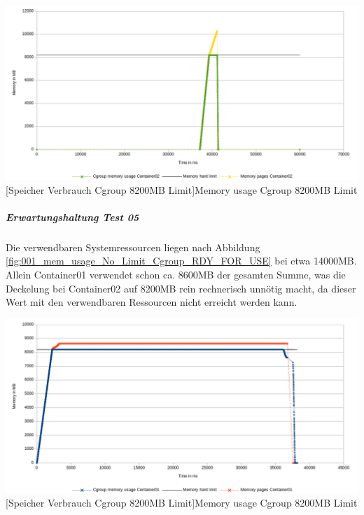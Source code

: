 \vspace{1em}
\begin{minipage}{\linewidth}
	\centering
	\includegraphics[width=1\linewidth]{pics/005_mem_usage_8200mb_limit_Container02_Basis_RDY_FOR_USE_FOCUS.png}
	[Speicher Verbrauch Cgroup 8200MB Limit]{Memory usage Cgroup 8200MB Limit}
	\label{fig:005_mem_usage_8200mb_limit_Container02_Basis_RDY_FOR_USE_FOCUS}
\end{minipage}

\subparagraph{Erwartungshaltung Test 05}
Die verwendbaren Systemressourcen liegen nach Abbildung \ref{fig:001_mem_usage_No_Limit_Cgroup_RDY_FOR_USE} bei etwa 14000MB. Allein Container01 verwendet schon ca. 8600MB der gesamten Summe, was die Deckelung bei Container02 auf 8200MB rein rechnerisch unnötig macht, da dieser Wert mit den verwendbaren Ressourcen nicht erreicht werden kann. 

\vspace{1em}
\begin{minipage}{\linewidth}
	\centering
	\includegraphics[width=1\linewidth]{pics/006_mem_usage_8200mb_limit_Container01_mit_ipact_RDY_FOR_USE.png}
	[Speicher Verbrauch Cgroup 8200MB Limit]{Memory usage Cgroup 8200MB Limit}
	\label{fig:006_mem_usage_8200mb_limit_Container01_mit_ipact_RDY_FOR_USE}
\end{minipage}

